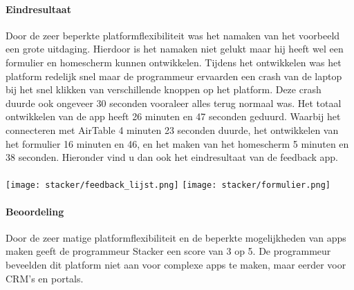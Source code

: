\paragraph*{Eindresultaat}
Door de zeer beperkte platformflexibiliteit was het namaken van het voorbeeld een grote uitdaging. Hierdoor is het namaken niet gelukt maar hij heeft wel een formulier en homescherm
kunnen ontwikkelen. Tijdens het ontwikkelen was het platform redelijk snel maar de programmeur ervaarden een crash van de laptop bij het snel klikken van verschillende knoppen op het platform.
Deze crash duurde ook ongeveer 30 seconden vooraleer alles terug normaal was. Het totaal ontwikkelen van de app heeft 26 minuten en 47 seconden geduurd. Waarbij het connecteren met AirTable 4 minuten 23 seconden duurde, het ontwikkelen van het formulier 16 minuten en 46,
en het maken van het homescherm 5 minuten en 38 seconden. Hieronder vind u dan ook het eindresultaat van de feedback app.
\\
\\
\texttt{[image: stacker/feedback\_lijst.png]}
\texttt{[image: stacker/formulier.png]}

\paragraph*{Beoordeling}
Door de zeer matige platformflexibiliteit en de beperkte mogelijkheden van apps maken geeft de programmeur Stacker een score van 3 op 5.
De programmeur beveelden dit platform niet aan voor complexe apps te maken, maar eerder voor CRM's en portals.

